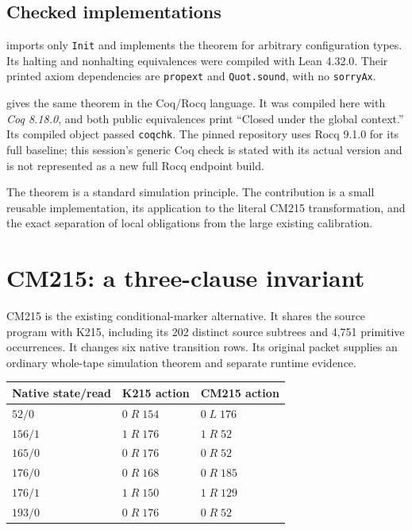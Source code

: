 \documentclass[11pt,letterpaper]{article}
\theoremstyle{definition}
\begin{document}
\subsection{Checked implementations}

 imports only \texttt{Init} and implements
the theorem for arbitrary configuration types. Its halting and nonhalting
equivalences were compiled with Lean 4.32.0. Their printed axiom
dependencies are \texttt{propext} and \texttt{Quot.sound}, with no
\texttt{sorryAx}.

 gives the same theorem in the Coq/Rocq
language. It was compiled here with \emph{Coq 8.18.0}, and both public
equivalences print ``Closed under the global context.'' Its compiled
object passed \texttt{coqchk}. The pinned repository uses Rocq 9.1.0 for
its full baseline; this session's generic Coq check is stated with its
actual version and is not represented as a new full Rocq endpoint build.

The theorem is a standard simulation principle. The contribution is a
small reusable implementation, its application to the literal CM215
transformation, and the exact separation of local obligations from the
large existing calibration.

\section{CM215: a three-clause invariant}

CM215 is the existing conditional-marker alternative. It shares the
source program with K215, including its 202 distinct source subtrees and
4,751 primitive occurrences. It changes six native transition rows.
Its original packet supplies an ordinary whole-tape simulation theorem
and separate runtime evidence.\cite{cm215}

\begin{center}
\begin{tabular}{@{}lll@{}}
\toprule
Native state/read & K215 action & CM215 action\\
\midrule
$52/0$  & $0\;R\;154$ & $0\;L\;176$\\
$156/1$ & $1\;R\;176$ & $1\;R\;52$\\
$165/0$ & $0\;R\;176$ & $0\;R\;52$\\
$176/0$ & $0\;R\;168$ & $0\;R\;185$\\
$176/1$ & $1\;R\;150$ & $1\;R\;129$\\
$193/0$ & $0\;R\;176$ & $0\;R\;52$\\
\bottomrule
\end{tabular}
\end{center}
\end{document}
